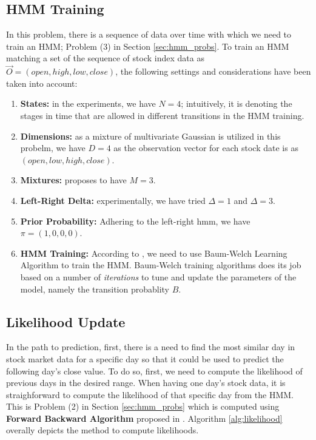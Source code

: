 \documentclass{acm_proc_article-sp}
\begin{document}
\subsection{HMM Training} \label{sec:train}
In this problem, there is a sequence of data over time with which we need to train an HMM; Problem (3) in Section
\ref{sec:hmm_probs}. To train an HMM matching a set of the sequence of stock index data as $\vec{O} = (open, high, low,
close)$, the following settings and considerations have been taken into account:
\begin{enumerate}
  \item \textbf{States:} in the experiments, we have $N = 4$; intuitively, it is denoting the stages in time that are
  allowed in different transitions in the HMM training.
  \item \textbf{Dimensions:} as a mixture of multivariate Gaussian is utilized in this probelm, we have $D = 4$ as the
  observation vector for each stock date is as $(open, low, high, close)$.
  \item \textbf{Mixtures:} \cite{hassan:hmm_stock} proposes to have $M = 3$.
  \item \textbf{Left-Right Delta:} experimentally, we have tried $\Delta = 1$ and $\Delta = 3$.
  \item \textbf{Prior Probability:} Adhering to the left-right hmm, we have $\pi = (1, 0, 0, 0)$.
  \item \textbf{HMM Training:} According to \cite{hassan:hmm_stock,rabiner:hmm}, we need to use Baum-Welch Learning
  Algorithm to train the HMM. Baum-Welch training algorithms does its job based on a number of \textit{iterations} to
  tune and update the parameters of the model, namely the transition probablity $B$. 
\end{enumerate}

\subsection{Likelihood Update} \label{sec:likelihood}
In the path to prediction, first, there is a need to find the most similar day in stock market data for a specific day
so that it could be used to predict the following day's close value. To do so, first, we need to compute the
likelihood of previous days in the desired range. When having one day's stock data, it is straighforward to compute
the likelihood of that specific day from the HMM. This is Problem (2) in Section \ref{sec:hmm_probs} which is computed using
\textbf{Forward Backward Algorithm} proposed in \cite{rabiner:hmm,erwin:datamining,wiki:hmm}. Algorithm
\ref{alg:likelihood} overally depicts the method to compute likelihoods.
\end{document}
